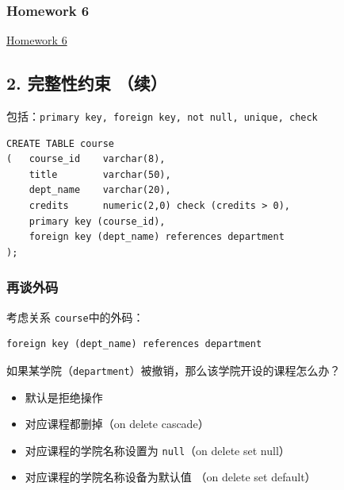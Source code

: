 \documentclass[aspectratio=169, 14pt]{beamer}
\begin{document}
\begin{frame}
    \frametitle{Homework 6}

\href{https://github.com/ChenZhongPu/db-swufe/tree/master/07_sql}{Homework 6}

\end{frame}

\begin{frame}
    \section{\textcolor{darkmidnightblue}{2. 完整性约束 （续）}}
    包括：\texttt{primary key, foreign key, not null, unique, check}

\end{frame}

\begin{frame}[fragile]

    \begin{verbatim}
CREATE TABLE course
(   course_id    varchar(8), 
    title        varchar(50), 
    dept_name    varchar(20),
    credits      numeric(2,0) check (credits > 0),
    primary key (course_id),
    foreign key (dept_name) references department
);
    \end{verbatim}

\end{frame}

\begin{frame}[fragile]
    \frametitle{再谈外码}

考虑关系 \texttt{course}中的外码：

\begin{verbatim}
foreign key (dept_name) references department 
\end{verbatim}

{\large {}}  如果某学院（\texttt{department}）被撤销，那么该学院开设的课程怎么办？
\pause
\begin{itemize}
    \item 默认是拒绝操作
    \item 对应课程都删掉（\alert{on delete cascade}）
    \item 对应课程的学院名称设置为 \texttt{null}（\alert{on delete set null}）
    \item 对应课程的学院名称设备为默认值 （\alert{on delete set default}）    
\end{itemize}

\end{frame}
\end{document}
